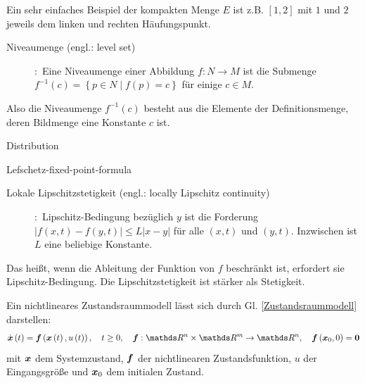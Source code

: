 \vspace{-0.8em}
Ein sehr einfaches Beispiel der kompakten Menge $E$ ist z.B. $\left [ 1,2 \right ]$ mit $1$ und $2$ jeweils dem linken und rechten Häufungspunkt. %
\begin{description}
\item[Niveaumenge (engl.: level set)]
\cite[S.94]{tu2010introduction}:~Eine Niveaumenge einer Abbildung $f:N \to M$ ist die Submenge $f^{-1}\left ( c \right )= \left \{ p\in N \mid f\left ( p \right )= c\right \}$ für einige $c\in M$.
\end{description}
\vspace{-0.8em}
Also die Niveaumenge $f^{-1}\left ( c \right )$ besteht aus die Elemente der Definitionsmenge, deren Bildmenge eine Konstante $c$ ist.
\begin{description}
\item[Distribution]
\end{description}
\begin{description}
\item[Lefschetz-fixed-point-formula]
\end{description}
\begin{description}
\item[Lokale Lipschitzstetigkeit (engl.: locally Lipschitz continuity)]
\cite[S.553]{bronstein2012taschenbuch}:~Lipschitz-Bedingung bezüglich $y$ ist die Forderung $\left | f\left ( x,t \right ) -f\left ( y,t \right )\right |\leq L\left | x-y \right |$ für alle $\left ( x,t \right )$ und $\left ( y,t \right )$. Inzwischen ist $L$ eine beliebige Konstante.
\end{description}
\vspace{-0.8em}
Das heißt, wenn die Ableitung der Funktion von $f$ beschränkt ist, erfordert sie Lipschitz-Bedingung. Die Lipschitzstetigkeit ist stärker als Stetigkeit.












Ein nichtlineares Zustandsraummodell lässt sich durch Gl. \ref{Zustandsraummodell} darstellen:
\begin{eqnarray}
\dot{\vect{x}}\left ( t \right )=\vect{f}\left (\vect{x}\left ( t \right ),u\left ( t \right )  \right ),~~~t\geq 0,~~~\vect{f}:\Reals^{n}\times\Reals^{m}\to\Reals^{n},~~~\vect{f}\left ({\vect{x}_{0}},0  \right )=\vect{0}
\label{Zustandsraummodell}
\end{eqnarray}
mit $\boldsymbol x$ dem Systemzustand, $\boldsymbol f$ der nichtlinearen Zustandsfunktion, $u$ der Eingangsgröße und $\boldsymbol x_{0}$ dem initialen Zustand. 

